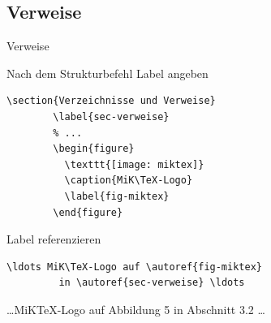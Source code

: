 \subsection{Verweise}

\begin{Frame}[fragile]{Verweise}
  \begin{looseitemize}
    \item \alert{Nach} dem Strukturbefehl Label angeben
      \begin{lstlisting}[gobble=8]
        \section{Verzeichnisse und Verweise}
        \label{sec-verweise}
        % ...
        \begin{figure}
          \texttt{[image: miktex]}
          \caption{MiK\TeX-Logo}
          \label{fig-miktex}
        \end{figure}
      \end{lstlisting}
     \item Label referenzieren
       \begin{lstlisting}[gobble=8]
         \ldots MiK\TeX-Logo auf \autoref{fig-miktex}
         in \autoref{sec-verweise} \ldots
       \end{lstlisting}
       \ldots MiK\TeX-Logo auf Abbildung 5 in Abschnitt 3.2 \ldots
  \end{looseitemize}
\end{Frame}

